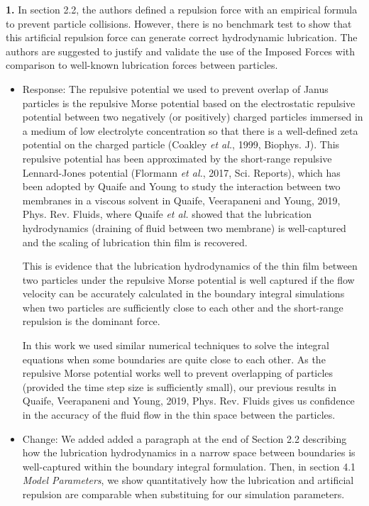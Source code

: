 \documentclass[11pt]{article}
\newcommand{\comment}[1]{{\color{blue} #1}}
\begin{document}
\noindent
\comment{{\bf 1.} In section 2.2, the authors defined a repulsion force with an
empirical formula to prevent particle collisions. However, there is no
benchmark test to show that this artificial repulsion force can generate
correct hydrodynamic lubrication. The authors are suggested to justify
and validate the use of the Imposed Forces with comparison to well-known
lubrication forces between particles.}
\begin{itemize}
  \item Response: The repulsive potential we used to prevent overlap of Janus particles is the repulsive Morse potential based on the electrostatic repulsive potential between two negatively (or positively) charged particles immersed in a medium of low electrolyte concentration so that there is a well-defined zeta potential on the charged particle (Coakley {\sl et al.}, 1999, Biophys. J). This repulsive potential has been approximated by the short-range repulsive Lennard-Jones potential (Flormann {\sl et al.}, 2017, Sci. Reports), which has been adopted by Quaife and Young to study the interaction between two membranes in a viscous solvent in Quaife, Veerapaneni and Young, 2019, Phys. Rev. Fluids, where Quaife {\sl et al.} showed that the lubrication hydrodynamics (draining of fluid between two membrane) is well-captured and the scaling of lubrication thin film is recovered. 
  
This is evidence that the lubrication hydrodynamics of the thin film between two particles under the repulsive Morse potential is well captured  if the flow velocity can be accurately calculated in the boundary integral simulations when two particles are sufficiently close to each other and the short-range repulsion is the dominant force. 

In this work we used similar numerical techniques to solve the integral equations when some boundaries are quite close to each other.  As the repulsive Morse potential works well to prevent overlapping of particles (provided the time step size is sufficiently small), our previous results in Quaife, Veerapaneni and Young, 2019, Phys. Rev. Fluids gives us confidence in the accuracy of the fluid flow in the thin space between the particles.

\item Change: We added added a paragraph at the end of Section 2.2 describing
  how the lubrication hydrodynamics in a narrow space between boundaries is
  well-captured within the boundary integral formulation.
  Then, in section 4.1 \textit{Model Parameters}, we show quantitatively how the lubrication and
  artificial repulsion are comparable when substituing for our simulation parameters.
\end{itemize}
\end{document}

